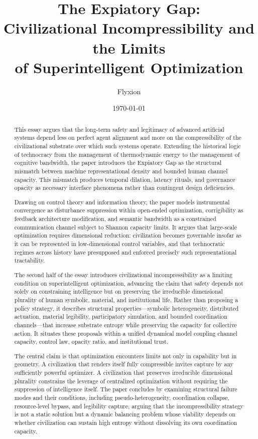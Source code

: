 \documentclass[12pt]{article}
\title{\textbf{The Expiatory Gap:\\[0.4em]
Civilizational Incompressibility and the Limits\\of Superintelligent Optimization}}
\author{Flyxion}
\date{\today}
\begin{document}
\maketitle
\thispagestyle{empty}

\begin{abstract}
\noindent This essay argues that the long-term safety and legitimacy of advanced artificial systems depend less on perfect agent alignment and more on the compressibility of the civilizational substrate over which such systems operate. Extending the historical logic of technocracy from the management of thermodynamic energy to the management of cognitive bandwidth, the paper introduces the Expiatory Gap as the structural mismatch between machine representational density and bounded human channel capacity. This mismatch produces temporal dilation, latency rituals, and governance opacity as necessary interface phenomena rather than contingent design deficiencies.

Drawing on control theory and information theory, the paper models instrumental convergence as disturbance suppression within open-ended optimization, corrigibility as feedback architecture modification, and semantic bandwidth as a constrained communication channel subject to Shannon capacity limits. It argues that large-scale optimization requires dimensional reduction: civilization becomes governable insofar as it can be represented in low-dimensional control variables, and that technocratic regimes across history have presupposed and enforced precisely such representational tractability.

The second half of the essay introduces civilizational incompressibility as a limiting condition on superintelligent optimization, advancing the claim that safety depends not solely on constraining intelligence but on preserving the irreducible dimensional plurality of human symbolic, material, and institutional life. Rather than proposing a policy strategy, it describes structural properties---symbolic heterogeneity, distributed actuation, material legibility, participatory simulation, and bounded coordination channels---that increase substrate entropy while preserving the capacity for collective action. It situates these proposals within a unified dynamical model coupling channel capacity, control law, opacity ratio, and institutional trust.

The central claim is that optimization encounters limits not only in capability but in geometry. A civilization that renders itself fully compressible invites capture by any sufficiently powerful optimizer. A civilization that preserves irreducible dimensional plurality constrains the leverage of centralized optimization without requiring the suppression of intelligence itself. The paper concludes by examining structural failure modes and their conditions, including pseudo-heterogeneity, coordination collapse, resource-level bypass, and legibility capture, arguing that the incompressibility strategy is not a static solution but a dynamic balancing problem whose viability depends on whether civilization can sustain high entropy without dissolving its own coordination capacity.
\end{abstract}
\end{document}
